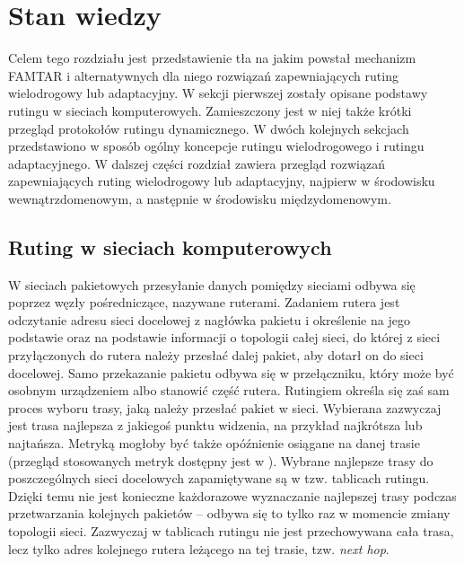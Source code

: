 \chapter{Stan wiedzy}
\label{chapter-2}

Celem tego rozdziału jest przedstawienie tła na jakim powstał mechanizm \mbox{FAMTAR} i alternatywnych dla niego rozwiązań zapewniających ruting wielodrogowy lub adaptacyjny. W sekcji pierwszej zostały opisane podstawy rutingu w sieciach komputerowych. Zamieszczony jest w niej także krótki przegląd protokołów rutingu dynamicznego. W dwóch kolejnych sekcjach przedstawiono w sposób ogólny koncepcje rutingu wielodrogowego i rutingu adaptacyjnego. W dalszej części rozdział zawiera przegląd rozwiązań zapewniających ruting wielodrogowy lub adaptacyjny, najpierw w środowisku wewnątrzdomenowym, a następnie w środowisku międzydomenowym.

\vspace{0.5cm}

\section{Ruting w sieciach komputerowych}

W sieciach pakietowych przesyłanie danych pomiędzy sieciami odbywa się poprzez węzły pośredniczące, nazywane ruterami. Zadaniem rutera jest odczytanie adresu sieci docelowej z nagłówka pakietu i określenie na jego podstawie oraz na podstawie informacji o topologii całej sieci, do której z sieci przyłączonych do rutera należy przesłać dalej pakiet, aby dotarł on do sieci docelowej. Samo przekazanie pakietu odbywa się w przełączniku, który może być osobnym urządzeniem albo stanowić część rutera. Rutingiem określa się zaś sam proces wyboru trasy, jaką należy przesłać pakiet w sieci. Wybierana zazwyczaj jest trasa najlepsza z jakiegoś punktu widzenia, na przykład najkrótsza lub najtańsza. Metryką mogłoby być także opóźnienie osiągane na danej trasie (przegląd stosowanych metryk dostępny jest w \cite{baumann2007survey}). Wybrane najlepsze trasy do poszczególnych sieci docelowych zapamiętywane są w tzw. tablicach rutingu. Dzięki temu nie jest konieczne każdorazowe wyznaczanie najlepszej trasy podczas przetwarzania kolejnych pakietów -- odbywa się to tylko raz w momencie zmiany topologii sieci. Zazwyczaj w tablicach rutingu nie jest przechowywana cała trasa, lecz tylko adres kolejnego rutera leżącego na tej trasie, tzw. \emph{next hop}.
